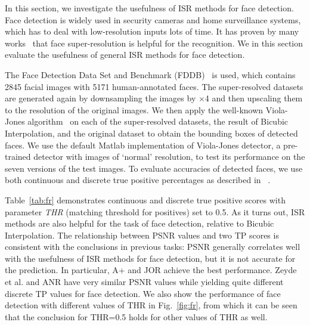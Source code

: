 \documentclass[10pt,twocolumn,letterpaper]{article}
\begin{document}
In this section, we investigate the usefulness of ISR methods for face detection. 
Face detection is widely used in security cameras and home surveillance systems, which has to deal with low-resolution inputs lots of time. 
It has proven by many works~\cite{face:SRTIP, face:SR08} that face super-resolution is helpful for the recognition. We in this section evaluate the usefulness of general ISR methods for face detection. 



The Face Detection Data Set and Benchmark (FDDB)~\cite{fddbTech}  is used, which contains 2845 facial images with 5171 human-annotated faces. The super-resolved datasets are generated again by downsampling the images by $\times$4 and then upscaling them to the resolution of the original images. We then apply the well-known Viola-Jones algorithm~\cite{viola2001rapid} on each of the super-resolved datasets, the result of Bicubic Interpolation, and the original dataset to obtain the bounding boxes of detected faces. 
We use the default Matlab implementation of Viola-Jones detector, a pre-trained detector with images of `normal' resolution, to test its performance on the seven versions of the test images.  To evaluate accuracies of detected faces, we use both continuous and discrete true positive percentages as described in ~\cite{fddbTech}. 



Table~\ref{tab:fr} demonstrates continuous and discrete true positive scores with parameter \emph{THR} (matching threshold for positives) set to 0.5. As it turns out, ISR methods are also helpful for the task of face detection, relative to Bicubic Interpolation. The relationship between PSNR values and two TP scores is consistent with the conclusions in previous tasks: 
PSNR generally correlates well with the usefulness of ISR methods for face detection, but it is not accurate for the prediction. 
In particular,  A+ and JOR achieve the best performance. Zeyde et al. and ANR have very similar PSNR values while yielding quite different discrete TP values for face detection.   
We also show the performance of face detection with different values of THR in Fig.~\ref{fig:fr}, from which it can be seen that the conclusion for THR=0.5 holds for other values of  THR as well. 
\end{document}
